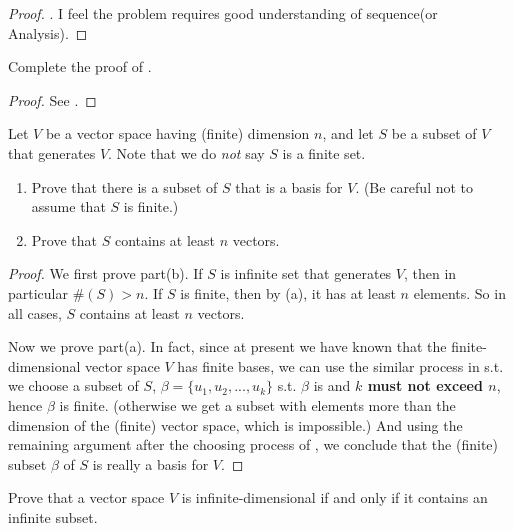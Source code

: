\begin{proof}
\TODOREF {}.
I feel the problem requires good understanding of sequence(or Analysis).
\end{proof}

\begin{exercise} \label{exercise 1.6.19}
Complete the proof of .
\end{exercise}

\begin{proof}
See .
\end{proof}

\begin{exercise} \label{exercise 1.6.20}
Let \(V\) be a vector space having (finite) dimension \(n\), and let \(S\) be a subset of \(V\) that generates \(V\).
Note that we do \emph{not} say \(S\) is a finite set.
\begin{enumerate}
\item Prove that there is a subset of \(S\) that is a basis for \(V\). (Be careful not to assume that \(S\) is finite.)
\item Prove that \(S\) contains at least \(n\) vectors.
\end{enumerate}
\end{exercise}

\begin{proof}
We first prove part(b).
If \(S\) is infinite set that generates \(V\), then in particular \(\#(S) > n\).
If \(S\) is finite, then by (a), it has at least \(n\) elements.
So in all cases, \(S\) contains at least \(n\) vectors.

Now we prove part(a).
In fact, since at present we have known that the finite-dimensional vector space \(V\) has finite bases, we can use the similar process in  s.t. we choose a subset of \(S\), \(\beta = \{ u_1, u_2, ..., u_k \}\) s.t. \(\beta\) is \LID{} and \textbf{\(k\) must not exceed \(n\)}, hence \(\beta\) is finite.
(otherwise we get a \LID{} subset with elements more than the dimension of the (finite) vector space, which is impossible.)
And using the remaining argument after the choosing process of , we conclude that the (finite) \LID{} subset \(\beta\) of \(S\) is really a basis for \(V\).
\end{proof}

\begin{exercise} \label{exercise 1.6.21}
Prove that a vector space \(V\) is infinite-dimensional if and only if it contains an infinite \LID{} subset.
\end{exercise}

